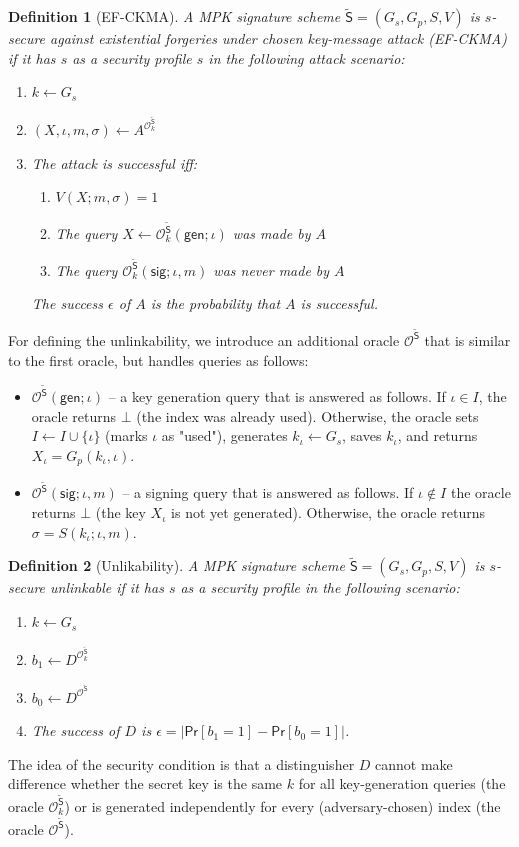 \documentclass{article}
\newtheorem{definition}{Definition}[section]
\begin{document}
\begin{definition}[EF-CKMA]
A MPK signature scheme $\tilde{\mathsf{S}}=(G_s,G_p,S,V)$ is $s$-secure against existential forgeries under
chosen key-message attack (EF-CKMA) if it has $s$ as a security profile $s$ in the following attack scenario:
\begin{enumerate}
\item $k\gets G_s$
\item $(X,\iota,m,\sigma)\gets A^{\mathcal{O}^{\tilde{\mathsf{S}}}_k}$
\item The attack is successful iff:
\begin{enumerate}
\item $V(X;m,\sigma)=1$
\item The query $X\gets \mathcal{O}^{\tilde{\mathsf{S}}}_k(\mathsf{gen};\iota)$ was made by $A$
\item The query $\mathcal{O}^{\tilde{\mathsf{S}}}_k(\mathsf{sig};\iota,m)$ was never made by $A$
\end{enumerate}
The success $\epsilon$ of $A$ is the probability that $A$ is successful.
\end{enumerate}
\end{definition}
For defining the unlinkability, we introduce an additional oracle $\mathcal{O}^{\tilde{\mathsf{S}}}$ that is similar to the first oracle, but handles
queries as follows:
\begin{itemize}
\item $\mathcal{O}^{\tilde{\mathsf{S}}}(\mathsf{gen};\iota)$ -- a key generation query that is answered as follows. If $\iota\in I$, the oracle returns $\bot$ (the index was already used). Otherwise, the oracle sets $I\gets I\cup \{\iota\}$ (marks $\iota$ as "used"), generates $k_\iota\gets G_s$, saves $k_\iota$, and returns $X_\iota = G_p(k_\iota,\iota)$.
\item $\mathcal{O}^{\tilde{\mathsf{S}}}(\mathsf{sig};\iota,m)$ -- a signing query that is answered as follows. If $\iota\not\in I$ the oracle returns $\bot$ (the key $X_\iota$ is not yet generated). Otherwise, the oracle returns $\sigma=S(k_\iota;\iota,m)$.
\end{itemize}
\begin{definition}[Unlikability]\label{def:unlinkability}
A MPK signature scheme $\tilde{\mathsf{S}}=(G_s,G_p,S,V)$ is $s$-secure unlinkable if it has $s$ as a security profile in the following scenario:
\begin{enumerate}
\item $k\gets G_s$
\item $b_1\gets D^{\mathcal{O}^{\tilde{\mathsf{S}}}_k}$
\item $b_0\gets D^{\mathcal{O}^{\tilde{\mathsf{S}}}}$
\item The success of $D$ is
$\epsilon=|\mathsf{Pr}[b_1=1]-\mathsf{Pr}[b_0=1]|$.
\end{enumerate}
\end{definition}
The idea of the security condition is that a distinguisher $D$ cannot make difference whether the secret key is the same $k$ for all key-generation queries (the oracle $\mathcal{O}^{\tilde{\mathsf{S}}}_k$)
or is generated independently for every (adversary-chosen) index (the oracle $\mathcal{O}^{\tilde{\mathsf{S}}}$).
\end{document}
